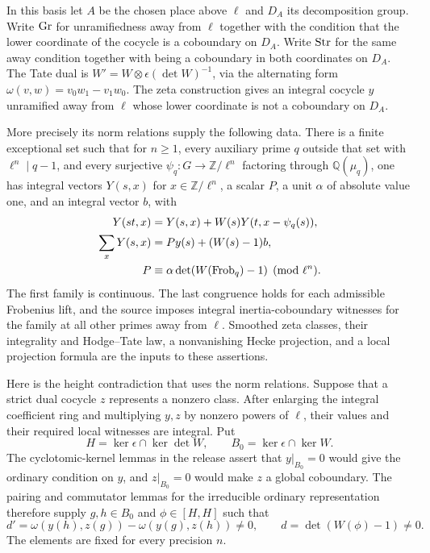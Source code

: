 In this basis let \(A\) be the chosen place above \(\ell\) and \(D_A\)
its decomposition group. Write \({\rm Gr}\) for unramifiedness away
from \(\ell\) together with the condition that the lower coordinate
of the cocycle is a coboundary on \(D_A\). Write \({\rm Str}\) for
the same away condition together with being a coboundary in both
coordinates on \(D_A\). The Tate dual is
\(W'=W\otimes\epsilon(\det W)^{-1}\), via the alternating
form \(\omega(v,w)=v_0w_1-v_1w_0\). The zeta construction gives
an integral cocycle \(y\) unramified away from \(\ell\) whose lower
coordinate is not a coboundary on \(D_A\).

More precisely its norm relations supply the following data. There
is a finite exceptional set such that for \(n\ge1\), every auxiliary
prime \(q\) outside that set with \(\ell^n\mid q-1\), and every
surjective \(\psi_q:G\to\mathbb Z/\ell^n\) factoring through
\(\mathbb Q(\mu_q)\), one has integral vectors \(Y(s,x)\) for
\(x\in\mathbb Z/\ell^n\), a scalar \(P\), a unit \(\alpha\) of
absolute value one, and an integral vector \(b\), with
\begin{align*}
 Y(st,x)&=Y(s,x)+W(s)Y(t,x-\psi_q(s)),\\
 \sum_xY(s,x)&=Py(s)+(W(s)-1)b,\\
 P&\equiv \alpha\det(W({\rm Frob}_q)-1)\pmod{\ell^n}.
\end{align*}
The first family is continuous. The last congruence holds for each
admissible Frobenius lift, and the source imposes integral
inertia-coboundary witnesses for the family at all other primes
away from \(\ell\). Smoothed zeta classes, their integrality and
Hodge--Tate law, a nonvanishing Hecke projection, and a local
projection formula are the inputs to these assertions.

Here is the height contradiction that uses the norm relations.
Suppose that a strict dual cocycle \(z\) represents a nonzero class.
After enlarging the integral coefficient ring and multiplying \(y,z\)
by nonzero powers of \(\ell\), their values and their required local
witnesses are integral. Put
\[
 H=\ker\epsilon\cap\ker\det W,\qquad B_0=\ker\epsilon\cap\ker W.
\]
The cyclotomic-kernel lemmas in the release assert that \(y|_{B_0}=0\)
would give the ordinary condition on \(y\), and \(z|_{B_0}=0\)
would make \(z\) a global coboundary. The pairing and commutator
lemmas for the irreducible ordinary representation therefore supply
\(g,h\in B_0\) and \(\phi\in[H,H]\) such that
\[
 d'=\omega(y(h),z(g))-\omega(y(g),z(h))\ne0,\qquad
 d=\det(W(\phi)-1)\ne0.
\]
The elements are fixed for every precision \(n\).

